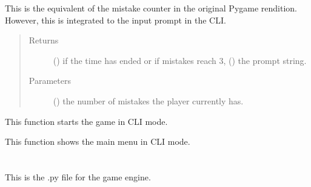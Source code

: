 \documentclass[letterpaper,10pt,english,openany,oneside]{sphinxmanual}
\begin{document}

\begin{fulllineitems}
\label{\detokenize{index:cli_interface.input_prompt}}
This is the equivalent of the mistake counter
in the original Pygame rendition. However,
this is integrated to the input prompt in the CLI.
\begin{quote}\begin{description}
\item[{Returns}] \leavevmode
() if the time has ended or if mistakes reach 3, () the prompt string.

\item[{Parameters}] \leavevmode
{} () \textendash{} the number of mistakes the player currently has.

\end{description}\end{quote}

\end{fulllineitems}


\begin{fulllineitems}
\label{\detokenize{index:cli_interface.start_game}}
This function starts the game in CLI mode.

\end{fulllineitems}


\begin{fulllineitems}
\label{\detokenize{index:cli_interface.start_menu}}
This function shows the main menu in CLI mode.

\end{fulllineitems}



\section{}
\label{\detokenize{index:module-engine}}\label{\detokenize{index:engine-py}}
This is the .py file for the game engine.
\end{document}

